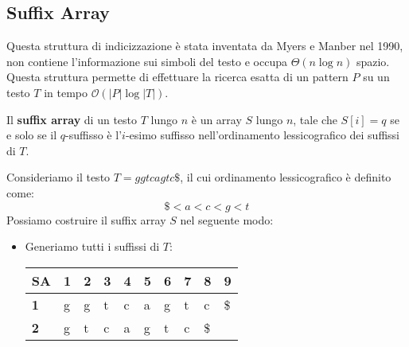 \subsection{Suffix Array}
Questa struttura di indicizzazione è stata inventata da Myers e Manber nel 1990,
non contiene l'informazione sui simboli del testo e occupa $\Theta(n \log n)$
spazio. Questa struttura permette di effettuare la ricerca esatta di un pattern
$P$ su  un testo $T$ in tempo $\mathcal{O}(|P| \log |T|)$.
\begin{definizione}
    Il \textbf{suffix array} di un testo $T$ lungo $n$ è un array $S$ lungo $n$,
    tale che $S[i]= q$ se e solo se il $q$-suffisso è l'$i$-esimo suffisso
    nell'ordinamento lessicografico dei suffissi di $T$.
\end{definizione}
\begin{esempio}
    Consideriamo il testo $T = ggtcagtc\$$, il cui ordinamento lessicografico è
    definito come:
    \begin{equation}
        \$ < a < c < g < t
    \end{equation}
    Possiamo costruire il suffix array $S$ nel seguente modo:
    \begin{itemize}
        \item Generiamo tutti i suffissi di $T$:
              \begin{table}[!ht]
                  \centering
                  \begin{tabular}{|
                          >{\columncolor[HTML]{EFEFEF}}l|lllllllll|}
                      \hline
                      \textbf{SA}                        &
                      \cellcolor[HTML]{EFEFEF}\textbf{1} &
                      \cellcolor[HTML]{EFEFEF}\textbf{2} &
                      \cellcolor[HTML]{EFEFEF}\textbf{3} &
                      \cellcolor[HTML]{EFEFEF}\textbf{4} &
                      \cellcolor[HTML]{EFEFEF}\textbf{5} &
                      \cellcolor[HTML]{EFEFEF}\textbf{6} &
                      \cellcolor[HTML]{EFEFEF}\textbf{7} &
                      \cellcolor[HTML]{EFEFEF}\textbf{8} &
                      \cellcolor[HTML]{EFEFEF}\textbf{9}                                              \\ \hline
                      \textbf{1}                         & g  & g  & t  & c  & a  & g  & t  & c  & \$ \\ \hline
                      \textbf{2}                         & g  & t  & c  & a  & g  & t  & c  & \$ &    \\ \hline

\end{tabular}
\end{table}
\end{itemize}
\end{esempio}
